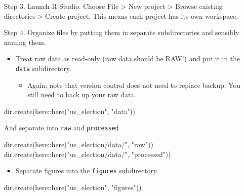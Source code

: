 \documentclass[
  letterpaper,
  DIV=11,
  numbers=noendperiod]{scrreprt}
\newenvironment{Shaded}{\begin{snugshade}}{\end{snugshade}}
\newcommand{\FunctionTok}[1]{\textcolor[rgb]{0.28,0.35,0.67}{#1}}
\newcommand{\NormalTok}[1]{\textcolor[rgb]{0.00,0.23,0.31}{#1}}
\newcommand{\SpecialCharTok}[1]{\textcolor[rgb]{0.37,0.37,0.37}{#1}}
\newcommand{\StringTok}[1]{\textcolor[rgb]{0.13,0.47,0.30}{#1}}
\providecommand{\tightlist}{%
  \setlength{\itemsep}{0pt}\setlength{\parskip}{0pt}}\usepackage{longtable,booktabs,array}
\begin{document}
Step 3. Launch R Studio. Choose File \textgreater{} New project
\textgreater{} Browse existing directories \textgreater{} Create
project. This means each project has its own workspace.

Step 4. Organize files by putting them in separate subdirectories and
sensibly naming them.

\begin{itemize}
\item
  Treat raw data as read-only (raw data should be RAW!) and put it in
  the \texttt{data} subdirectory.

  \begin{itemize}
  \tightlist
  \item
    Again, note that version control does not need to replace backup.
    You still need to back up your raw data.
  \end{itemize}
\end{itemize}

\begin{Shaded}
\begin{Highlighting}[]
\FunctionTok{dir.create}\NormalTok{(here}\SpecialCharTok{::}\FunctionTok{here}\NormalTok{(}\StringTok{"us\_election"}\NormalTok{, }\StringTok{"data"}\NormalTok{))}
\end{Highlighting}
\end{Shaded}

And separate into \texttt{raw} and \texttt{processed}

\begin{Shaded}
\begin{Highlighting}[]
\FunctionTok{dir.create}\NormalTok{(here}\SpecialCharTok{::}\FunctionTok{here}\NormalTok{(}\StringTok{"us\_election/data/"}\NormalTok{, }\StringTok{"raw"}\NormalTok{))}
\FunctionTok{dir.create}\NormalTok{(here}\SpecialCharTok{::}\FunctionTok{here}\NormalTok{(}\StringTok{"us\_election/data/"}\NormalTok{, }\StringTok{"processed"}\NormalTok{))}
\end{Highlighting}
\end{Shaded}

\begin{itemize}
\tightlist
\item
  Separate figures into the \texttt{figures} subdirectory.
\end{itemize}

\begin{Shaded}
\begin{Highlighting}[]
\FunctionTok{dir.create}\NormalTok{(here}\SpecialCharTok{::}\FunctionTok{here}\NormalTok{(}\StringTok{"us\_election"}\NormalTok{, }\StringTok{"figures"}\NormalTok{))}
\end{Highlighting}
\end{Shaded}
\end{document}
